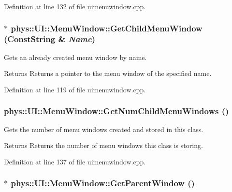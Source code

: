 Definition at line 132 of file uimenuwindow.cpp.

\hypertarget{classphys_1_1UI_1_1MenuWindow_ad1136c4e4b2ff9b9dc5d6aac2dba45a7}{
\subsubsection[{GetChildMenuWindow}]{ $\ast$ phys::UI::MenuWindow::GetChildMenuWindow ({\bf ConstString} \& {\em Name})}}
\label{d4/d07/classphys_1_1UI_1_1MenuWindow_ad1136c4e4b2ff9b9dc5d6aac2dba45a7}


Gets an already created menu window by name. 

\begin{DoxyReturn}{Returns}
Returns a pointer to the menu window of the specified name. 
\end{DoxyReturn}


Definition at line 119 of file uimenuwindow.cpp.

\hypertarget{classphys_1_1UI_1_1MenuWindow_ab3a6ae708ba2cea16cd0de176e265459}{
\subsubsection[{GetNumChildMenuWindows}]{ phys::UI::MenuWindow::GetNumChildMenuWindows ()}}
\label{d4/d07/classphys_1_1UI_1_1MenuWindow_ab3a6ae708ba2cea16cd0de176e265459}


Gets the number of menu windows created and stored in this class. 

\begin{DoxyReturn}{Returns}
Returns the number of menu windows this class is storing. 
\end{DoxyReturn}


Definition at line 137 of file uimenuwindow.cpp.

\hypertarget{classphys_1_1UI_1_1MenuWindow_ac47ccc564f09ac33e13e56860b6ae281}{
\subsubsection[{GetParentWindow}]{ $\ast$ phys::UI::MenuWindow::GetParentWindow ()}}
\label{d4/d07/classphys_1_1UI_1_1MenuWindow_ac47ccc564f09ac33e13e56860b6ae281}


